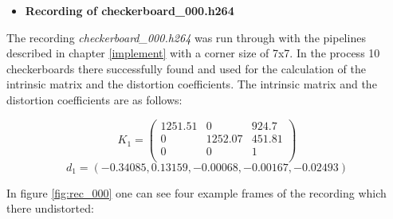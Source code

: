 \newpage

\begin{itemize}[leftmargin=*]
    \item \textbf{\large Recording of checkerboard\_000.h264}
\end{itemize}
The recording \textit{checkerboard\_000.h264} was run through with the pipelines described in chapter \ref{implement} with a corner size of 7x7. In the process 10 checkerboards there successfully found and used for the calculation of the intrinsic matrix and the distortion coefficients. The intrinsic matrix and the distortion coefficients are as follows:

\vspace{1mm}
\begin{equation*}
    K_1 = 
    \begin{pmatrix}
        1251.51 & 0 & 924.7\\
        0 & 1252.07 & 451.81\\
        0 & 0 & 1\\
    \end{pmatrix}
\end{equation*}
\vspace{1mm}
\begin{equation*}
    d_1 = (-0.34085, 0.13159, -0.00068, -0.00167, -0.02493)
\end{equation*}

In figure \ref{fig:rec_000} one can see four example frames of the recording which there undistorted:

